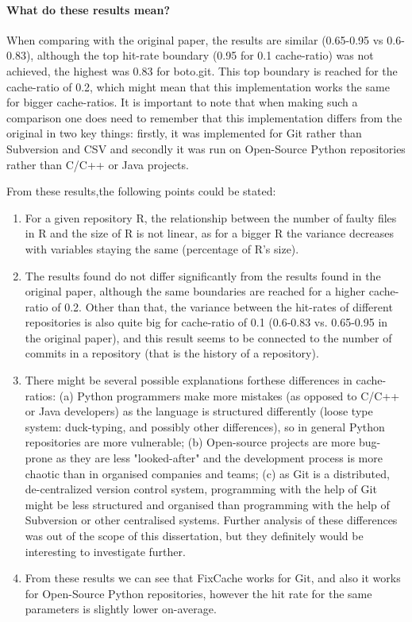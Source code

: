 \documentclass[12pt,twoside,notitlepage]{report}
\newcommand{\fxch}{FixCache}
\begin{document}
\paragraph{What do these results mean?} When comparing with the original paper, the results are similar (0.65-0.95 vs 0.6-0.83), although the top hit-rate boundary (0.95 for 0.1 cache-ratio) was not achieved, the highest was 0.83 for boto.git. This top boundary is reached for the cache-ratio of 0.2, which might mean that this implementation works the same for bigger cache-ratios. It is important to note that when making such a comparison one does need to remember that this implementation differs from the original in two key things: firstly, it was implemented for Git rather than Subversion and CSV and secondly it was run on Open-Source Python repositories rather than C/C++ or Java projects. 

From these results,the following points could be stated:
\begin{enumerate}
\item For a given repository R, the relationship between the number of faulty files in R and the size of R is not linear, as for a bigger R the variance decreases with variables staying the same (percentage of R's size).
\item The results found do not differ significantly from the results found in the original paper, although the same boundaries are reached for a higher cache-ratio of 0.2. Other than that, the variance between the hit-rates of different repositories is also quite big for cache-ratio of 0.1 (0.6-0.83 vs. 0.65-0.95 in the original paper), and this result seems to be connected to the number of commits in a repository (that is the history of a repository).
\item There might be several possible explanations forthese differences in cache-ratios: (a) Python programmers make more mistakes (as opposed to C/C++ or Java developers) as the language is structured differently (loose type system: duck-typing, and possibly other differences), so in general Python repositories are more vulnerable; (b) Open-source projects are more bug-prone as they are less "looked-after" and the development process is more chaotic than in organised companies and teams; (c) as Git is a distributed, de-centralized version control system, programming with the help of Git might be less structured and organised than programming with the help of Subversion or other centralised systems. Further analysis of these differences was out of the scope of this dissertation, but they definitely would be interesting to investigate further.
\item From these results we can see that \fxch{} works for Git, and also it works for Open-Source Python repositories, however the hit rate for the same parameters is slightly lower on-average.
\end{enumerate}
\end{document}

